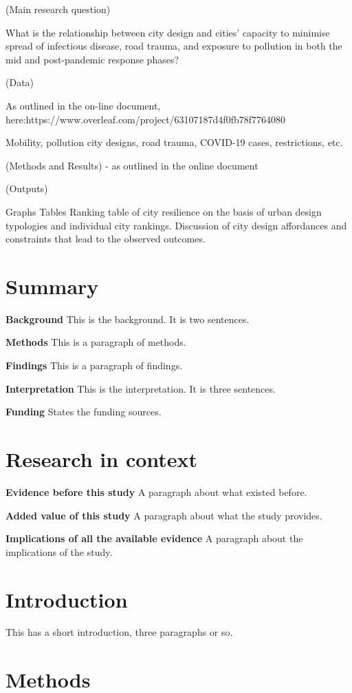 \documentclass[preprint,12pt]{elsarticle}
\begin{document}
(Main research question)

What is the relationship between city design and cities’ capacity to minimise spread of infectious disease, road trauma, and exposure to pollution in both the mid and post-pandemic response phases?

(Data)

As outlined in the on-line document, here:https://www.overleaf.com/project/63107187d4f0fb78f7764080

Mobility, pollution city designs, road trauma, COVID-19 cases, restrictions, etc.

(Methods and Results) - as outlined in the online document

(Outputs)

    Graphs
    Tables
    Ranking table of city resilience on the basis of urban design typologies and individual city rankings.
    Discussion of city design affordances and constraints that lead to the observed outcomes.


\section*{Summary}
\textbf{Background} This is the background. It is two sentences.

\textbf{Methods} This is a paragraph of methods.


\textbf{Findings} This is a paragraph of findings.

\textbf{Interpretation} This is the interpretation. It is three sentences.

\textbf{Funding} States the funding sources.

\section*{Research in context}

\textbf{Evidence before this study} 
A paragraph about what existed before.

\textbf{Added value of this study} 
A paragraph about what the study provides.

\textbf{Implications of all the available evidence} 
A paragraph about the implications of the study.

\section*{Introduction}
This has a short introduction, three paragraphs or so.

\section*{Methods}
\end{document}
